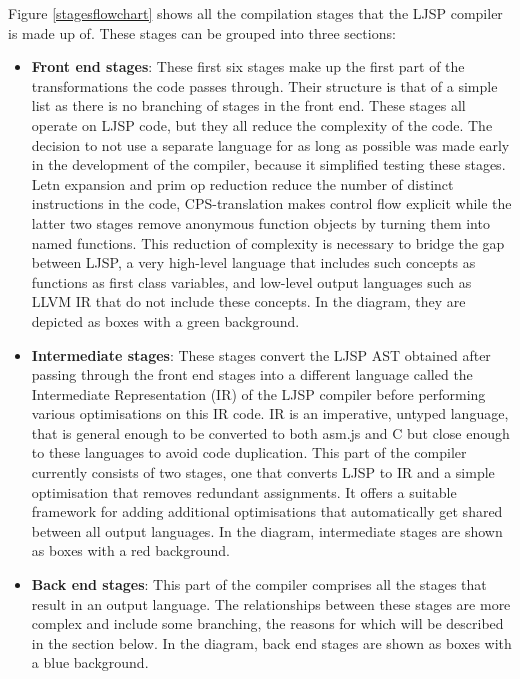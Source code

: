 \documentclass[11pt]{report}
\begin{document}
Figure \ref{stagesflowchart} shows all the compilation stages that the LJSP compiler is made up of. These stages  can be grouped into three sections:
\begin{itemize}
\item \textbf{Front end stages}: These first six stages make up the first part of the transformations the code passes through. Their structure is that of a simple list as there is no branching of stages in the front end. These stages all operate on LJSP code, but they all reduce the complexity of the code. The decision to not use a separate language for as long as possible was made early in the development of the compiler, because it simplified testing these stages. Letn expansion and prim op reduction reduce the number of distinct instructions in the code, CPS-translation makes control flow explicit while the latter two stages remove anonymous function objects by turning them into named functions. This reduction of complexity is necessary to bridge the gap between LJSP, a very high-level language that includes such concepts as functions as first class variables, and low-level output languages such as LLVM IR that do not include these concepts. In the diagram, they are depicted as boxes with a green background.

\item \textbf{Intermediate stages}: These stages convert the LJSP AST obtained after passing through the front end stages into a different language called the Intermediate Representation (IR) of the LJSP compiler before performing various optimisations on this IR code. IR is an imperative, untyped language, that is general enough to be converted to both asm.js and C but close enough to these languages to avoid code duplication. This part of the compiler currently consists of two stages, one that converts LJSP to IR and a simple optimisation that removes redundant assignments. It offers a suitable framework for adding additional optimisations that automatically get shared between all output languages. In the diagram, intermediate stages are shown as boxes with a red background.

\item \textbf{Back end stages}: This part of the compiler comprises all the stages that result in an output language. The relationships between these stages are more complex and include some branching, the reasons for which will be described in the section below. In the diagram, back end stages are shown as boxes with a blue background.
\end{itemize}
\end{document}
